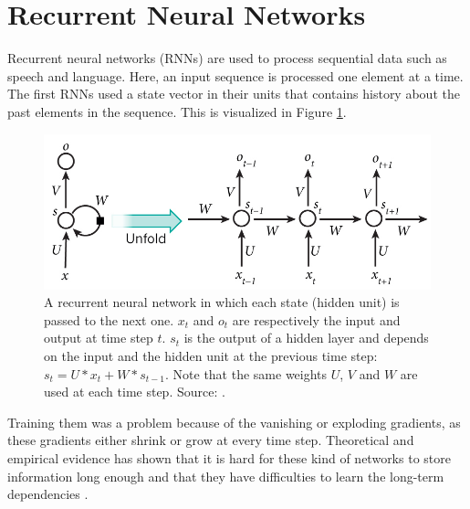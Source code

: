 \section{Recurrent Neural Networks}
Recurrent neural networks (RNNs) are used to process sequential data such as speech and language. Here, an input sequence is processed one element at a time. The first RNNs used a state vector in their units that contains history about the past elements in the sequence. This is visualized in Figure \ref{fig:rnnunrolled}.
\begin{figure}[htb]
\centering
\includegraphics[width=0.8\linewidth]{images/RNN-unrolled.jpg} %
\caption[Recurrent neural network]{A recurrent neural network in which each state (hidden unit) is passed to the next one. $x_t$ and $o_t$ are respectively the input and output at time step $t$. $s_t$ is the output of a hidden layer and depends on the input and the hidden unit at the previous time step: $s_t = U*x_t + W*s_{t-1}$. Note that the same weights $U$, $V$ and $W$ are used at each time step. Source: \cite{LeCun2015DeepLearning}.}
\label{fig:rnnunrolled}
\end{figure}

Training them was a problem because of the vanishing or exploding gradients, as these gradients either shrink or grow at every time step. Theoretical and empirical evidence has shown that it is hard for these kind of networks to store information long enough and that they have difficulties to learn the long-term dependencies \parencite{bengio1994learning}.\\ %

